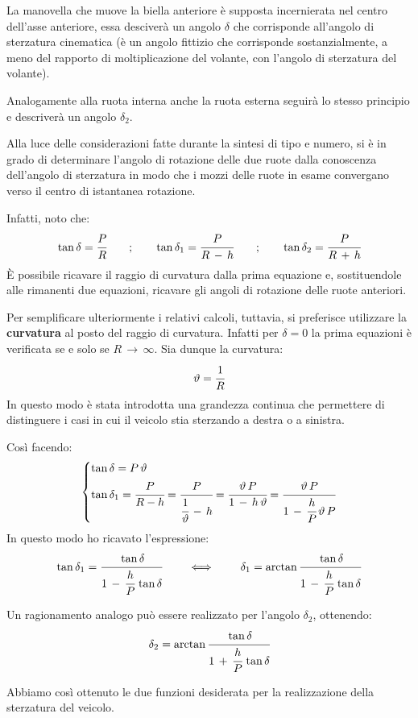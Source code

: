 La manovella che muove la biella anteriore è supposta incernierata nel centro dell'asse anteriore, essa desciverà un angolo $\delta$ che corrisponde all'angolo di sterzatura cinematica (è un angolo fittizio che corrisponde sostanzialmente, a meno del rapporto di moltiplicazione del volante, con l'angolo di sterzatura del volante). 

Analogamente alla ruota interna anche la ruota esterna seguirà lo stesso principio e descriverà un angolo $\delta_ 2$.

Alla luce delle considerazioni fatte durante la sintesi di tipo e numero, si è in grado di determinare l'angolo di rotazione delle due ruote dalla conoscenza dell'angolo di sterzatura in modo che i mozzi delle ruote in esame convergano verso il centro di istantanea rotazione.

Infatti, noto che:
\[\tan{\delta} = \cfrac{P}{R}\qquad;\qquad \tan{\delta_1} = \cfrac{P}{R\,-\,h}\qquad;\qquad\tan{\delta_2} = \cfrac{P}{R\,+\,h }\]
È possibile ricavare il raggio di curvatura dalla prima equazione e, sostituendole alle rimanenti due equazioni, ricavare gli angoli di rotazione delle ruote anteriori.

Per semplificare ulteriormente i relativi calcoli, tuttavia, si preferisce utilizzare la \textbf{curvatura} al posto del raggio di curvatura. Infatti per $\delta = 0$ la prima equazioni è verificata se e solo se $R\,\to\,\infty$. Sia dunque la curvatura:
\[\theta = \cfrac{1}{R}\]
In questo modo è stata introdotta una grandezza continua che permettere di distinguere i casi in cui il veicolo stia sterzando a destra o a sinistra.

Così facendo:
\[
\begin{dcases}
\tan{\delta} = P\,\theta\\
\tan{\delta_1} = \cfrac{P}{R-h} = \cfrac{P}{\cfrac{1}{\theta}\,-\,h} = \cfrac{\theta\,P}{1\,-\,h\,\theta} = \cfrac{\theta\,P}{1\,-\,\cfrac{h}{P}\,\theta\,P}
\end{dcases}
\]
In questo modo ho ricavato l'espressione:
\[\tan{\delta_1} = \cfrac{\tan{\delta}}{1\,-\,\cfrac{h}{P}\,\tan{\delta}}\qquad\iff\qquad \delta_1 = \arctan{\cfrac{\tan{\delta}}{1\,-\,\cfrac{h}{P}\,\tan{\delta}}}\]

Un ragionamento analogo può essere realizzato per l'angolo $\delta_2$, ottenendo:
\[\delta_2 = \arctan{\cfrac{\tan{\delta}}{1\,+\,\cfrac{h}{P}\,\tan{\delta}}}\]

Abbiamo così ottenuto le due funzioni desiderata per la realizzazione della sterzatura del veicolo.

